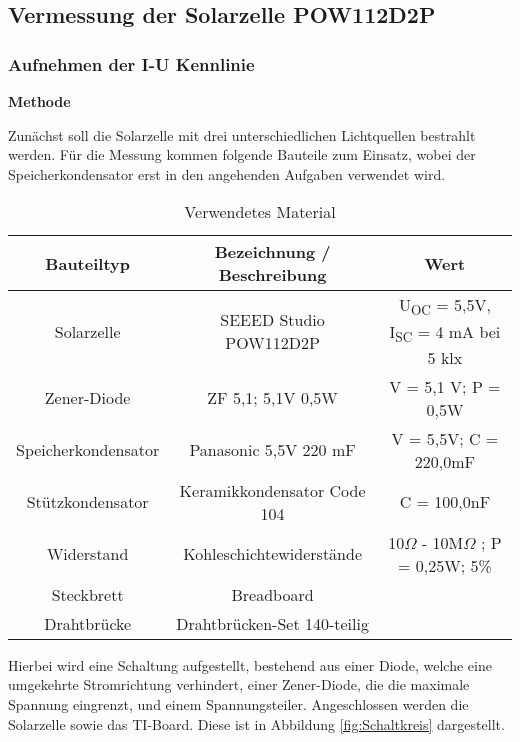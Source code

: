 \subsection {Vermessung der Solarzelle POW112D2P}                   %
    \subsubsection{Aufnehmen der I-U Kennlinie}                         %
        \textbf{Methode}
        \newline
        
        \par Zunächst soll die Solarzelle mit drei unterschiedlichen Lichtquellen bestrahlt werden. 
        Für die Messung kommen folgende Bauteile zum Einsatz, wobei der Speicherkondensator erst in den angehenden Aufgaben verwendet wird.
        \begin{table}[H]
        	\centering
        	\caption{Verwendetes Material}
        	\label{tab:Bauteile}
        	\begin{tabular}{ccc}
        		\toprule
        		Bauteiltyp & Bezeichnung / Beschreibung & Wert\\
        		\midrule
        		Solarzelle & SEEED Studio POW112D2P  & U\textsubscript{OC} = 5,5V, I\textsubscript{SC} = 4 mA bei 5 klx \\
        		Zener-Diode & ZF 5,1; 5,1V 0,5W  & V = 5,1 V; P = 0,5W \\
        		Speicherkondensator & Panasonic 5,5V 220 mF & V = 5,5V; C = 220,0mF \\
        		Stützkondensator & Keramikkondensator Code 104 & C = 100,0nF \\
        		Widerstand & Kohleschichtewiderstände  & 10$\Omega$ - 10M$\Omega$ ; P = 0,25W; 5\% \\
        		Steckbrett & Breadboard
        		& \ \\
        		Drahtbrücke & Drahtbrücken-Set 140-teilig
        		& \ \\
        		\bottomrule
        	\end{tabular}
        \end{table}
    	\vspace{1mm}
        Hierbei wird eine Schaltung aufgestellt, bestehend aus einer Diode, welche eine umgekehrte Stromrichtung verhindert, einer Zener-Diode, die die maximale Spannung eingrenzt, und einem Spannungsteiler. Angeschlossen werden die Solarzelle sowie das TI-Board. Diese ist in Abbildung \ref{fig:Schaltkreis} dargestellt.
